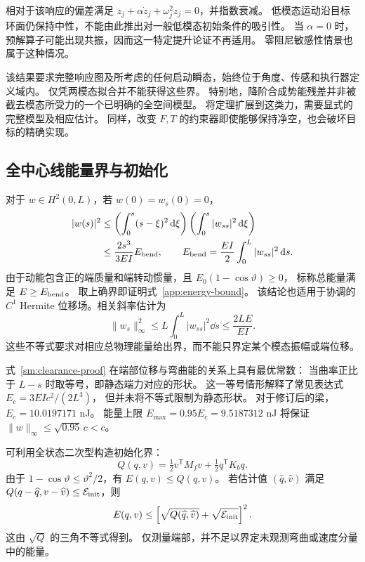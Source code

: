 相对于该响应的偏差满足 $\ddot z_j+\alpha\dot z_j+\omega_j^2z_j=0$，并指数衰减。
低模态运动沿目标环面仍保持中性，不能由此推出对一般低模态初始条件的吸引性。
当 $\alpha=0$ 时，预解算子可能出现共振，因而这一特定提升论证不再适用。
零阻尼敏感性情景也属于这种情况。

该结果要求完整响应图及所考虑的任何启动瞬态，始终位于角度、传感和执行器定义域内。
仅凭两模态拟合并不能获得这些界。
特别地，降阶合成势能残差并非被截去模态所受力的一个已明确的全空间模型。
将定理扩展到这类力，需要显式的完整模型及相应估计。
同样，改变 $F,T$ 的约束器即使能够保持净空，也会破坏目标的精确实现。

\subsection{全中心线能量界与初始化}
\label{sm:clearance}
对于 $w\in H^2(0,L)$，若 $w(0)=w_s(0)=0$，
\begin{align}
 |w(s)|^2
 &\le\left(\int_0^s(s-\xi)^2\,\mathrm d\xi\right)
                \left(\int_0^s|w_{ss}|^2\,\mathrm d\xi\right)\nonumber\\
 &\le\frac{2s^3}{3EI}E_{\rm bend},\qquad
 E_{\rm bend}=\frac{EI}{2}\int_0^L|w_{ss}|^2\,\mathrm d s.
 \label{sm:clearance-proof}
\end{align}
由于动能包含正的端质量和端转动惯量，且 $E_0(1-\cos\vartheta)\ge0$，
标称总能量满足 $E\ge E_{\rm bend}$。
取上确界即证明式~\eqref{app:energy-bound}。
该结论也适用于协调的 $C^1$ Hermite 位移场。相关斜率估计为
\begin{equation}
 \|w_s\|_\infty^2
 \le L\int_0^L|w_{ss}|^2\dd s
 \le\frac{2LE}{EI}.
 \label{sm:slope-energy}
\end{equation}
这些不等式要求对相应总物理能量给出界，而不能只界定某个模态振幅或端位移。

式~\eqref{sm:clearance-proof} 在端部位移与弯曲能的关系上具有最优常数：
当曲率正比于 $L-s$ 时取等号，即静态端力对应的形状。
这一等号情形解释了常见表达式 $E_c=3EIc^2/(2L^3)$，
但并未将不等式限制为静态形状。
对于修订后的梁，$E_c=10.0197171$ nJ。
能量上限 $E_{\max}=0.95E_c=9.5187312$ nJ 将保证
$\|w\|_\infty\le\sqrt{0.95}\,c<c$。

可利用全状态二次型构造初始化界：
\begin{equation}
 Q(q,v)=\tfrac12v^{\mathsf T}M_fv+
        \tfrac12q^{\mathsf T}K_bq.
 \label{sm:initial-quadratic}
\end{equation}
由于 $1-\cos\vartheta\le\vartheta^2/2$，有 $E(q,v)\le Q(q,v)$。
若估计值 $(\widehat q,\widehat v)$ 满足
$Q(q-\widehat q,v-\widehat v)\le\mathcal E_{\rm init}$，则
\begin{equation}
 E(q,v)\le
 \left[\sqrt{Q(\widehat q,\widehat v)}
                  +\sqrt{\mathcal E_{\rm init}}\right]^2.
 \label{sm:initial-upper-bound}
\end{equation}
这由 $\sqrt Q$ 的三角不等式得到。
仅测量端部，并不足以界定未观测弯曲或速度分量中的能量。

